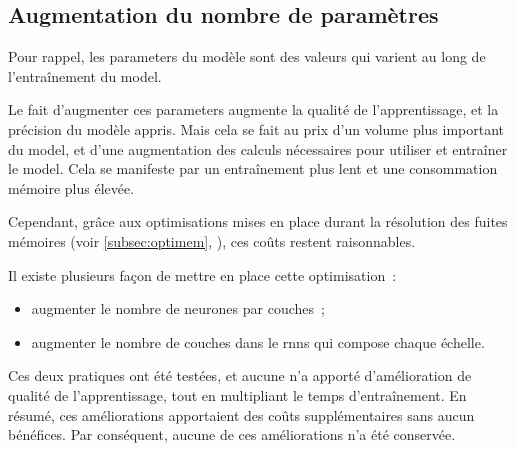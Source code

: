 \subsection{Augmentation du nombre de paramètres}\label{subsec:optiparam}
Pour rappel, les \glspl{parameter} du modèle sont des valeurs qui varient au long de l'entraînement du \gls{model}.

Le fait d'augmenter ces \glspl{parameter} augmente la qualité de l'apprentissage, et la précision du modèle appris. Mais cela se fait au prix d'un volume plus important du \gls{model}, et d'une augmentation des calculs nécessaires pour utiliser et entraîner le \gls{model}. Cela se manifeste par un entraînement plus lent et une consommation mémoire plus élevée.

Cependant, grâce aux optimisations mises en place durant la résolution des fuites mémoires (voir \autoref{subsec:optimem}, ), ces coûts restent raisonnables.

\pagebreak
Il existe plusieurs façon de mettre en place cette optimisation~:
\begin{itemize}
	\item augmenter le nombre de neurones par couches~;
	\item augmenter le nombre de couches dans le \glspl{rnn} qui compose chaque \og échelle\fg{}.
\end{itemize}
\vspace{1em}

Ces deux pratiques ont été testées, et aucune n'a apporté d'amélioration de qualité de l'apprentissage, tout en multipliant le temps d'entraînement.
En résumé, ces améliorations apportaient des coûts supplémentaires sans aucun bénéfices. Par conséquent, aucune de ces améliorations n'a été conservée.